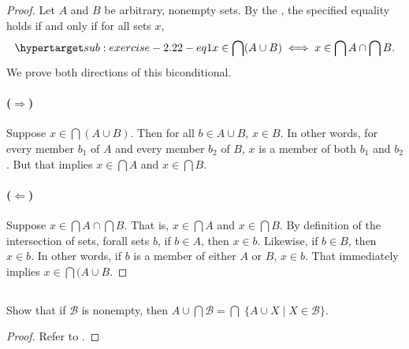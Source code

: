 \documentclass{report}
\begin{document}
  \begin{proof}
    Let $A$ and $B$ be arbitrary, nonempty sets.
    By the , the specified equality holds if
      and only if for all sets $x$,
      \begin{equation}
        \hyperlabel{sub:exercise-2.22-eq1}
        x \in \bigcap (A \cup B) \iff x \in \bigcap A \cap \bigcap B.
      \end{equation}
    We prove both directions of this biconditional.

    \paragraph{($\Rightarrow$)}%

      Suppose $x \in \bigcap (A \cup B)$.
      Then for all $b \in A \cup B$, $x \in B$.
      In other words, for every member $b_1$ of $A$ and every member $b_2$ of
        $B$, $x$ is a member of both $b_1$ and $b_2$.
      But that implies $x \in \bigcap A$ and $x \in \bigcap B$.

    \paragraph{($\Leftarrow$)}%

      Suppose $x \in \bigcap A \cap \bigcap B$.
      That is, $x \in \bigcap A$ and $x \in \bigcap B$.
      By definition of the intersection of sets, forall sets $b$, if $b \in A$,
        then $x \in b$.
      Likewise, if $b \in B$, then $x \in b$.
      In other words, if $b$ is a member of either $A$ or $B$, $x \in b$.
      That immediately implies $x \in \bigcap (A \cup B$.

  \end{proof}

\subsection{}%

  Show that if $\mathscr{B}$ is nonempty, then
    $A \cup \bigcap \mathscr{B} =
      \bigcap\; \{A \cup X \mid X \in \mathscr{B} \}$.

  \begin{proof}
    Refer to .
  \end{proof}

\subsection{}%
\end{document}
